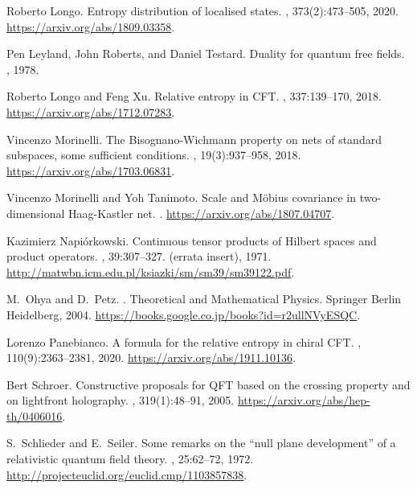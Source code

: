 \documentclass[12pt]{article}
\theoremstyle{remark}
\begin{document}
{\begin{thebibliography}{KLLSM18}
Roberto Longo.
\newblock Entropy distribution of localised states.
, 373(2):473--505, 2020.
\newblock \url{https://arxiv.org/abs/1809.03358}.

Pen Leyland, John Roberts, and Daniel Testard.
\newblock Duality for quantum free fields.
, 1978.

Roberto Longo and Feng Xu.
\newblock Relative entropy in {CFT}.
, 337:139--170, 2018.
\newblock \url{https://arxiv.org/abs/1712.07283}.

Vincenzo Morinelli.
\newblock The {B}isognano-{W}ichmann property on nets of standard subspaces,
  some sufficient conditions.
, 19(3):937--958, 2018.
\newblock \url{https://arxiv.org/abs/1703.06831}.

Vincenzo Morinelli and Yoh Tanimoto.
\newblock Scale and {M}\"obius covariance in two-dimensional {H}aag-{K}astler
  net.
.
\newblock \url{https://arxiv.org/abs/1807.04707}.

Kazimierz Napi\'{o}rkowski.
\newblock Continuous tensor products of {H}ilbert spaces and product operators.
, 39:307--327. (errata insert), 1971.
\newblock \url{http://matwbn.icm.edu.pl/ksiazki/sm/sm39/sm39122.pdf}.

M.~Ohya and D.~Petz.
.
\newblock Theoretical and Mathematical Physics. Springer Berlin Heidelberg,
  2004.
\newblock \url{https://books.google.co.jp/books?id=r2ullNVyESQC}.

Lorenzo Panebianco.
\newblock A formula for the relative entropy in chiral {CFT}.
, 110(9):2363--2381, 2020.
\newblock \url{https://arxiv.org/abs/1911.10136}.

Bert Schroer.
\newblock Constructive proposals for {QFT} based on the crossing property and
  on lightfront holography.
, 319(1):48--91, 2005.
\newblock \url{https://arxiv.org/abs/hep-th/0406016}.

S.~Schlieder and E.~Seiler.
\newblock Some remarks on the ``null plane development'' of a relativistic
  quantum field theory.
, 25:62--72, 1972.
\newblock \url{http://projecteuclid.org/euclid.cmp/1103857838}.


\end{thebibliography}}
\end{document}

